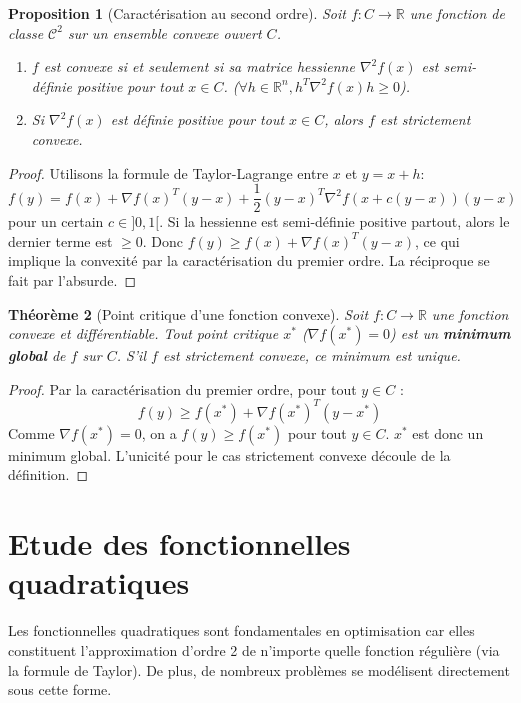 \documentclass[a4paper,12pt,openany]{book}
\theoremstyle{plain}
\newtheorem{theorem}{Théorème}[section]
\newtheorem{proposition}[theorem]{Proposition}
\theoremstyle{definition}
\theoremstyle{remark}
\theoremstyle{nbstyle}
\newcommand{\R}{\mathbb{R}}
\newcommand{\grad}{\nabla}
\newcommand{\hess}{\nabla^2}
\newcommand{\T}{^T}
\begin{document}
	\begin{proposition}[Caractérisation au second ordre]
		Soit $f: C \to \R$ une fonction de classe $\mathcal{C}^2$ sur un ensemble convexe ouvert $C$.
		\begin{enumerate}
			\item $f$ est convexe si et seulement si sa matrice hessienne $\hess f(x)$ est semi-définie positive pour tout $x \in C$. ($\forall h \in \R^n, h\T \hess f(x) h \ge 0$).
			\item Si $\hess f(x)$ est définie positive pour tout $x \in C$, alors $f$ est strictement convexe.
		\end{enumerate}
	\end{proposition}
	\begin{proof}
		Utilisons la formule de Taylor-Lagrange entre $x$ et $y=x+h$:
		$$ f(y) = f(x) + \grad f(x)\T(y-x) + \frac{1}{2}(y-x)\T \hess f(x+c(y-x)) (y-x) $$
		pour un certain $c \in ]0,1[$.
		Si la hessienne est semi-définie positive partout, alors le dernier terme est $\ge 0$. Donc $f(y) \ge f(x) + \grad f(x)\T(y-x)$, ce qui implique la convexité par la caractérisation du premier ordre. La réciproque se fait par l'absurde.
	\end{proof}
	
	\begin{theorem}[Point critique d'une fonction convexe]
		Soit $f: C \to \R$ une fonction convexe et différentiable. Tout point critique $x^*$ ($\grad f(x^*) = 0$) est un \textbf{minimum global} de $f$ sur $C$. S'il $f$ est strictement convexe, ce minimum est unique.
	\end{theorem}
	\begin{proof}
		Par la caractérisation du premier ordre, pour tout $y \in C$ :
		$$ f(y) \ge f(x^*) + \grad f(x^*)\T(y-x^*) $$
		Comme $\grad f(x^*) = 0$, on a $f(y) \ge f(x^*)$ pour tout $y \in C$. $x^*$ est donc un minimum global. L'unicité pour le cas strictement convexe découle de la définition.
	\end{proof}
	
	
	\section{Etude des fonctionnelles quadratiques}
	
	Les fonctionnelles quadratiques sont fondamentales en optimisation car elles constituent l'approximation d'ordre 2 de n'importe quelle fonction régulière (via la formule de Taylor). De plus, de nombreux problèmes se modélisent directement sous cette forme.
	
\end{document}
